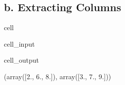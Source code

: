 \documentclass[letterpaper,10pt,english]{jupyterBook}
\begin{document}
\subsection{b. Extracting Columns}
\label{\detokenize{lessons/Intro_to_Matrices_in_NumPy:b-extracting-columns}}
\begin{sphinxuseclass}{cell}\begin{sphinxVerbatimInput}

\begin{sphinxuseclass}{cell_input}
\begin{sphinxVerbatim}[commandchars=\\\{\}]
  \PYG{p}{[} \PYG{p}{]}

   \PYG{p}{[}\PYG{p}{]}

 
\end{sphinxVerbatim}

\end{sphinxuseclass}\end{sphinxVerbatimInput}
\begin{sphinxVerbatimOutput}

\begin{sphinxuseclass}{cell_output}
\begin{sphinxVerbatim}[commandchars=\\\{\}]
(array([2., 6., 8.]), array([3., 7., 9.]))
\end{sphinxVerbatim}

\end{sphinxuseclass}\end{sphinxVerbatimOutput}

\end{sphinxuseclass}
\end{document}
